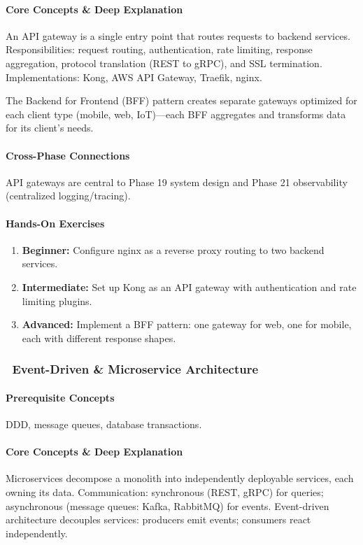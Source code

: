\documentclass[11pt, a4paper, oneside]{report}
\newcommand{\mustmaster}[1]{\subsubsection{\texorpdfstring{\fcolorbox{blue!40!black}{blue!8}{\footnotesize\bfseries\color{blue!40!black} MUST MASTER}~#1}{#1}}}
\begin{document}
\paragraph{Core Concepts \& Deep Explanation} An API gateway is a single entry point that routes requests to backend services. Responsibilities: request routing, authentication, rate limiting, response aggregation, protocol translation (REST to gRPC), and SSL termination. Implementations: Kong, AWS API Gateway, Traefik, nginx.

The Backend for Frontend (BFF) pattern creates separate gateways optimized for each client type (mobile, web, IoT)---each BFF aggregates and transforms data for its client's needs.

\paragraph{Cross-Phase Connections} API gateways are central to Phase 19 system design and Phase 21 observability (centralized logging/tracing).

\paragraph{Hands-On Exercises}
\begin{enumerate}[leftmargin=*]
\item \textbf{Beginner:} Configure nginx as a reverse proxy routing to two backend services.
\item \textbf{Intermediate:} Set up Kong as an API gateway with authentication and rate limiting plugins.
\item \textbf{Advanced:} Implement a BFF pattern: one gateway for web, one for mobile, each with different response shapes.
\end{enumerate}

\mustmaster{Event-Driven \& Microservice Architecture}

\paragraph{Prerequisite Concepts} DDD, message queues, database transactions.

\paragraph{Core Concepts \& Deep Explanation} Microservices decompose a monolith into independently deployable services, each owning its data. Communication: synchronous (REST, gRPC) for queries; asynchronous (message queues: Kafka, RabbitMQ) for events. Event-driven architecture decouples services: producers emit events; consumers react independently.
\end{document}
